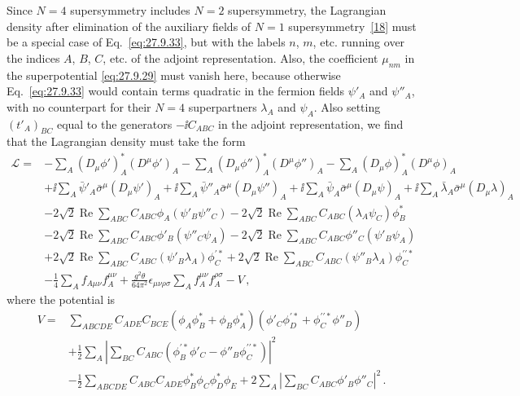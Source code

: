 Since \(N=4\) supersymmetry includes \(N=2\) supersymmetry, the
Lagrangian density after elimination of the auxiliary fields of \(N=1\)
supersymmetry~\hyperref[ch27-ref-18]{[18]} must be a special case of
Eq.~\eqref{eq:27.9.33}, but with the labels \(n\), \(m\), etc. running over
the indices \(A\), \(B\), \(C\), etc. of the adjoint representation. Also,
the coefficient \(\mu_{nm}\) in the superpotential \eqref{eq:27.9.29} must
vanish here, because otherwise Eq.~\eqref{eq:27.9.33} would contain terms
quadratic in the fermion fields \(\psi'_A\) and \(\psi''_A\), with no
counterpart for their \(N=4\) superpartners \(\lambda_A\) and \(\psi_A\).
Also setting \((t'_A)_{BC}\) equal to the generators \(-\ii C_{ABC}\) in the
adjoint representation, we find that the Lagrangian density must take the
form
\begin{equation}
  \begin{aligned}
  \mathcal{L}={}&
  -\sum_A(D_\mu\phi')_A^*(D^\mu\phi')_A
  -\sum_A(D_\mu\phi'')_A^*(D^\mu\phi'')_A
  -\sum_A(D_\mu\phi)_A^*(D^\mu\phi)_A
  \\
  &+\ii\sum_A\bar\psi'_A\bar\sigma^\mu(D_\mu\psi')_A
  +\ii\sum_A\bar\psi''_A\bar\sigma^\mu(D_\mu\psi'')_A
  +\ii\sum_A\bar\psi_A\bar\sigma^\mu(D_\mu\psi)_A
  +\ii\sum_A\bar\lambda_A\bar\sigma^\mu(D_\mu\lambda)_A
  \\
  &-2\sqrt{2}\operatorname{Re}\sum_{ABC}C_{ABC}\phi_A
    \left(\psi'_B\psi''_C\right)
  -2\sqrt{2}\operatorname{Re}\sum_{ABC}C_{ABC}
    \left(\lambda_A\psi_C\right)\phi_B^*
  \\
  &-2\sqrt{2}\operatorname{Re}\sum_{ABC}C_{ABC}\phi'_B
    \left(\psi''_C\psi_A\right)
  -2\sqrt{2}\operatorname{Re}\sum_{ABC}C_{ABC}\phi''_C
    \left(\psi'_B\psi_A\right)
  \\
  &+2\sqrt{2}\operatorname{Re}\sum_{ABC}C_{ABC}
    \left(\psi'_B\lambda_A\right)\phi_C^{\prime *}
  +2\sqrt{2}\operatorname{Re}\sum_{ABC}C_{ABC}
    \left(\psi''_B\lambda_A\right)
    \phi_C^{\prime\prime *}
  \\
  &-\frac14\sum_Af_{A\mu\nu}f_A^{\mu\nu}
  +\frac{g^2\theta}{64\pi^2}\epsilon_{\mu\nu\rho\sigma}
    \sum_Af_A^{\mu\nu}f_A^{\rho\sigma}-V\,,
  \end{aligned}
  \tag{27.9.35}\label{eq:27.9.35}
\end{equation}
where the potential is
\begin{equation}
  \begin{aligned}
  V={}&
  \sum_{ABCDE}C_{ADE}C_{BCE}
    \left(\phi_A\phi_B^*+\phi_B\phi_A^*\right)
    \left(\phi'_C\phi_D^{\prime *}+\phi_C^{\prime\prime *}\phi''_D\right)
  \\
  &+\frac12\sum_A\left|
    \sum_{BC}C_{ABC}
    \left(\phi_B^{\prime *}\phi'_C-\phi''_B\phi_C^{\prime\prime *}\right)
  \right|^2
  \\
  &-\frac12\sum_{ABCDE}C_{ABC}C_{ADE}
    \phi_B^*\phi_C\phi_D^*\phi_E
  +2\sum_A\left|\sum_{BC}C_{ABC}\phi'_B\phi''_C\right|^2\,.
  \end{aligned}
  \tag{27.9.36}\label{eq:27.9.36}
\end{equation}
